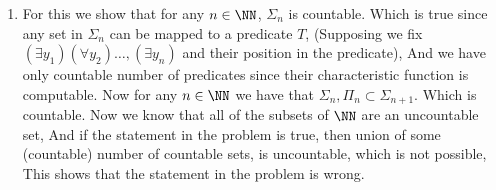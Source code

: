 \begin{enumerate}[label=]
    \item
        For this we show that for any $n \in \NN$, $\Sigma_n$ is countable. Which is true since any set in $\Sigma_n$ can be mapped to a predicate $T$, (Supposing we fix $(\exists y_1) (\forall y_2) \dots, (\exists y_n)$ and their position in the predicate), And we have only countable number of predicates since their characteristic function is computable. Now for any $n \in \NN$ we have that $\Sigma_n , \Pi_n \subset \Sigma_{n + 1}$. Which is countable. Now we know that all of the subsets of $\NN$ are an uncountable set, And if the statement in the problem is true, then union of some (countable) number of countable sets, is uncountable, which is not possible, This shows that the statement in the problem is wrong.
\end{enumerate}
